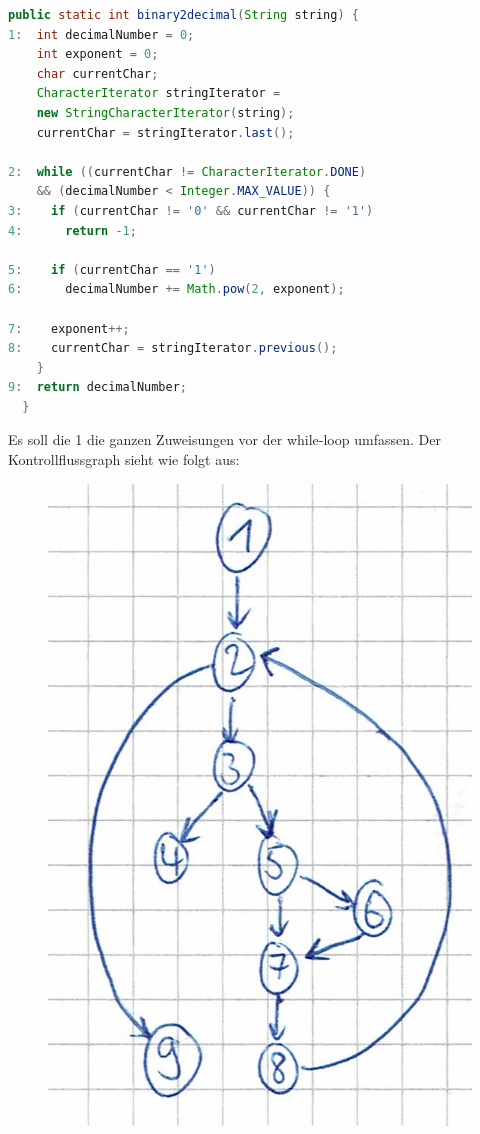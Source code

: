 \begin{lstlisting}[language=Java]
  public static int binary2decimal(String string) {
1:  int decimalNumber = 0;                      
    int exponent = 0;
    char currentChar;
    CharacterIterator stringIterator = 
    new StringCharacterIterator(string);
    currentChar = stringIterator.last();

2:  while ((currentChar != CharacterIterator.DONE) 
    && (decimalNumber < Integer.MAX_VALUE)) {
3:    if (currentChar != '0' && currentChar != '1')
4:      return -1;

5:    if (currentChar == '1')
6:      decimalNumber += Math.pow(2, exponent);

7:    exponent++;
8:    currentChar = stringIterator.previous();
    }
9:  return decimalNumber;
  }
\end{lstlisting}
Es soll die 1 die ganzen Zuweisungen vor der while-loop umfassen. Der Kontrollflussgraph sieht wie folgt aus:
\begin{figure}[H]
  \centering
  \includegraphics{2_cont.jpg}
\end{figure}
